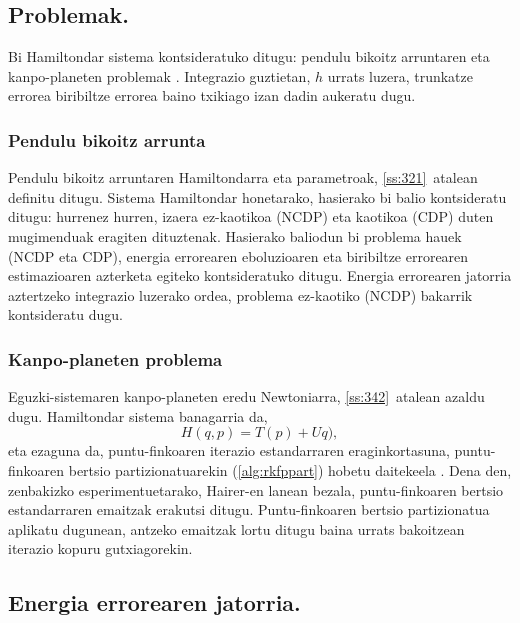 \subsection{Problemak.}

Bi Hamiltondar sistema kontsideratuko ditugu: pendulu bikoitz arruntaren eta kanpo-planeten problemak \cite{Hairer2006} \cite{Dumitru}. Integrazio guztietan, $h$ urrats luzera, trunkatze errorea biribiltze errorea baino txikiago izan dadin aukeratu dugu.

\subsubsection*{Pendulu bikoitz arrunta}
Pendulu bikoitz arruntaren Hamiltondarra eta parametroak, \ref{ss:321}~atalean definitu ditugu. Sistema Hamiltondar honetarako, hasierako bi balio kontsideratu ditugu: hurrenez hurren, izaera ez-kaotikoa (NCDP) eta kaotikoa (CDP) duten mugimenduak eragiten dituztenak. Hasierako baliodun bi problema hauek (NCDP eta CDP), energia errorearen eboluzioaren eta biribiltze errorearen estimazioaren azterketa egiteko kontsideratuko ditugu. Energia errorearen jatorria aztertzeko integrazio luzerako ordea, problema ez-kaotiko (NCDP) bakarrik kontsideratu dugu.       

\subsubsection*{Kanpo-planeten problema}
Eguzki-sistemaren kanpo-planeten eredu Newtoniarra, \ref{ss:342}~atalean azaldu dugu. Hamiltondar sistema banagarria da,
\begin{equation*}
H(q,p)= T(p)+Uq),
\end{equation*}
eta ezaguna da, puntu-finkoaren iterazio estandarraren eraginkortasuna, puntu-finkoaren bertsio partizionatuarekin (\ref{alg:rkfppart})  hobetu daitekeela  \cite{Sanz-Serna1992}. Dena den, zenbakizko esperimentuetarako, Hairer-en \cite{Hairer2008} lanean bezala, puntu-finkoaren bertsio estandarraren emaitzak erakutsi ditugu. Puntu-finkoaren bertsio partizionatua aplikatu dugunean, antzeko emaitzak lortu ditugu baina urrats bakoitzean iterazio kopuru gutxiagorekin.  


\subsection{Energia errorearen jatorria.}

